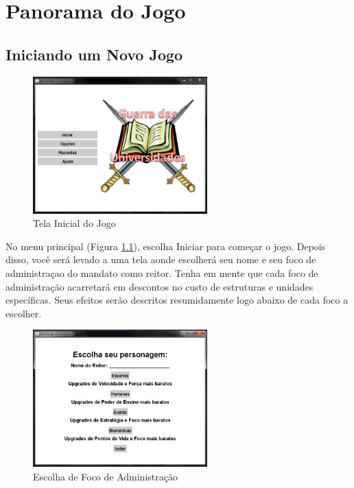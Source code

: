 \documentclass[brazil,times]{abnt}
\begin{document}
\chapter{Panorama do Jogo}

\section{Iniciando um Novo Jogo}
\begin{figure}[htp]
\begin{center}
  \includegraphics[width=0.6\textwidth]{img/Figura1manual.PNG}
  \caption[Tela Inicial do Jogo]{Tela Inicial do Jogo}
  \label{tela-inicial}
\end{center}
\end{figure}

No menu principal (Figura \ref{tela-inicial}), escolha Iniciar para começar o
jogo. Depois disso, você será levado a uma tela aonde escolherá seu nome e seu foco
de administraçao do mandato como reitor. Tenha em mente que cada foco de
administração acarretará em descontos no custo de estruturas e unidades
específicas. Seus efeitos serão descritos resumidamente logo abaixo de cada
foco a escolher.

\begin{figure}[htp]
\begin{center}
  \includegraphics[width=0.6\textwidth]{img/Figura2manual.PNG}
  \caption[Escolha de Foco de Administração]{Escolha de Foco de
   Administração}
  \label{escolha-foco}
\end{center}
\end{figure}
\end{document}
